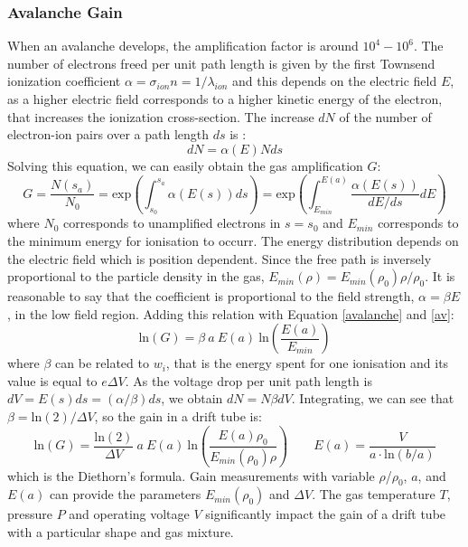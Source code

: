 \subsubsection{Avalanche Gain}
When an avalanche develops, the amplification factor is around $10^4-10^6$. The number of electrons freed per unit path length is given
by the first Townsend ionization coefficient $\alpha=\sigma_{ion}n=1/\lambda_{ion}$ and this depends on the electric field $E$, 
as a higher electric field corresponds to a higher kinetic energy of the electron, that increases the ionization cross-section.
The increase $dN$ of the number of electron-ion pairs over a path length $ds$ is \cite{kola}:
\begin{equation}
    dN=\alpha(E)Nds
\end{equation}
Solving this equation, we can easily obtain the gas amplification $G$:
\begin{equation}\label{av}
    G=\frac{N(s_a)}{N_0}=\text{exp} \left( \int_{s_0}^{s_a} \alpha(E(s)) ds \right)=\text{exp} \left( \int_{E_{min}}^{E(a)} \frac{\alpha(E(s))}{dE/ds} dE \right)
\end{equation}
where $N_0$ corresponds to unamplified electrons in $s=s_0$ and $E_{min}$ corresponds to the minimum energy 
for ionisation to occurr. The energy distribution depends on the electric field which is position dependent. 
Since the free path is inversely proportional to the particle density in the gas, $E_{min}(\rho)=E_{min}(\rho_0)\rho/\rho_0$.
It is reasonable to say that the coefficient is proportional to the field strength, $\alpha= \beta E$, in the low field region. 
Adding this relation with Equation \ref{avalanche} and \ref{av}:
\begin{equation}
     \text{ln}(G)=\beta \ a \ E(a) \ \text{ln}\left( \frac{E(a)}{E_{min}}\right)
\end{equation}
where $\beta$ can be related to $w_i$, that is the energy spent for one ionisation and its value is equal to $e \Delta V$.
As the voltage drop per unit path length is $dV = E(s)ds = (\alpha/\beta)ds$, we obtain $dN=N \beta dV$. Integrating, we can see that
$\beta= \text{ln}(2)/\Delta V$, so the gain in a drift tube is:
\begin{equation}\label{XXX}
     \text{ln}(G)=\frac{ \text{ln}(2)}{\Delta V} \ a \ E(a)  \ \text{ln}\left( \frac{E(a)\rho_0}{E_{min}(\rho_0)\rho}\right) \qquad E(a)=\frac{V}{a \cdot \text{ln}(b/a)}
\end{equation}
which is the Diethorn's formula. 
Gain measurements with variable $\rho$/$\rho_0$, $a$, and $E(a)$ can provide the parameters $E_{min} (\rho_0)$ and $\Delta V$. 
The gas temperature $T$, pressure $P$ and operating voltage $V$ significantly impact the gain of a drift tube with a particular shape and gas mixture. 
